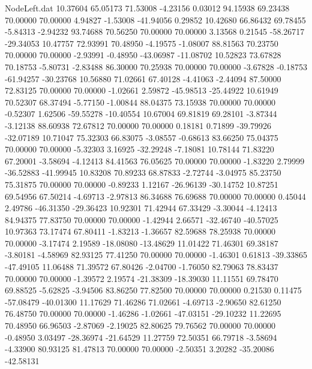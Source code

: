 \begin{filecontents}{NodeLeft.dat}
  10.37604   65.05173   71.53008    -4.23156    0.03012   94.15938   69.23438   70.00000   70.00000    4.94827   -1.53008  -41.94056    0.29852
  10.42680   66.86432   69.78455    -5.84313   -2.94232   93.74688   70.56250   70.00000   70.00000    3.13568    0.21545  -58.26717  -29.34053
  10.47757   72.93991   70.48950    -4.19575   -1.08007   88.81563   70.23750   70.00000   70.00000   -2.93991   -0.48950  -43.06987  -11.08702
  10.52823   73.67828   70.18753    -5.80731   -2.83488   86.30000   70.25938   70.00000   70.00000   -3.67828   -0.18753  -61.94257  -30.23768
  10.56880   71.02661   67.40128    -4.41063   -2.44094   87.50000   72.83125   70.00000   70.00000   -1.02661    2.59872  -45.98513  -25.44922
  10.61949   70.52307   68.37494    -5.77150   -1.00844   88.04375   73.15938   70.00000   70.00000   -0.52307    1.62506  -59.55278  -10.40554
  10.67004   69.81819   69.28101    -3.87344   -3.12138   88.60938   72.67812   70.00000   70.00000    0.18181    0.71899  -39.79926  -32.07189
  10.71047   75.32303   66.83075    -3.08557   -0.68613   83.66250   75.04375   70.00000   70.00000   -5.32303    3.16925  -32.29248   -7.18081
  10.78144   71.83220   67.20001    -3.58694   -4.12413   84.41563   76.05625   70.00000   70.00000   -1.83220    2.79999  -36.52883  -41.99945
  10.83208   70.89233   68.87833    -2.72744   -3.04975   85.23750   75.31875   70.00000   70.00000   -0.89233    1.12167  -26.96139  -30.14752
  10.87251   69.54956   67.50214    -4.69713   -2.97813   86.34688   76.69688   70.00000   70.00000    0.45044    2.49786  -46.31350  -29.36423
  10.92301   71.42944   67.33429    -3.30044   -4.12413   84.94375   77.83750   70.00000   70.00000   -1.42944    2.66571  -32.46740  -40.57025
  10.97363   73.17474   67.80411    -1.83213   -1.36657   82.59688   78.25938   70.00000   70.00000   -3.17474    2.19589  -18.08080  -13.48629
  11.01422   71.46301   69.38187    -3.80181   -4.58969   82.93125   77.41250   70.00000   70.00000   -1.46301    0.61813  -39.33865  -47.49105
  11.06488   71.39572   67.80426    -2.04700   -1.76050   82.79063   78.83437   70.00000   70.00000   -1.39572    2.19574  -21.38309  -18.39030
  11.11551   69.78470   69.88525    -5.62825   -3.94506   83.86250   77.82500   70.00000   70.00000    0.21530    0.11475  -57.08479  -40.01300
  11.17629   71.46286   71.02661    -4.69713   -2.90650   82.61250   76.48750   70.00000   70.00000   -1.46286   -1.02661  -47.03151  -29.10232
  11.22695   70.48950   66.96503    -2.87069   -2.19025   82.80625   79.76562   70.00000   70.00000   -0.48950    3.03497  -28.36974  -21.64529
  11.27759   72.50351   66.79718    -3.58694   -4.33900   80.93125   81.47813   70.00000   70.00000   -2.50351    3.20282  -35.20086  -42.58131

\end{filecontents}
